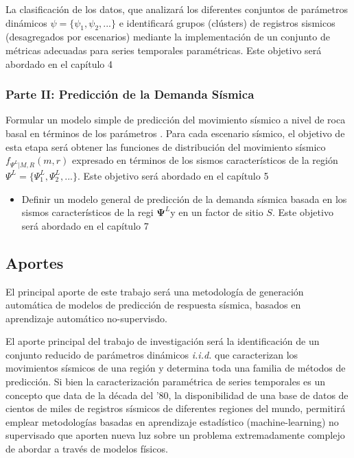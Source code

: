 \documentclass[
]{krantz}
\providecommand{\tightlist}{%
  \setlength{\itemsep}{0pt}\setlength{\parskip}{0pt}}
\begin{document}
La clasificación de los datos, que analizará los diferentes conjuntos de parámetros dinámicos \(\psi = \{ \psi_1,\psi_2,... \}\) e identificará grupos (clústers) de registros sismicos (desagregados por escenarios) mediante la implementación de un conjunto de métricas adecuadas para series temporales paramétricas. Este objetivo será abordado en el capítulo 4

\hypertarget{parte-ii-predicciuxf3n-de-la-demanda-suxedsmica}{%
\subsubsection*{Parte II: Predicción de la Demanda Sísmica}\label{parte-ii-predicciuxf3n-de-la-demanda-suxedsmica}}

Formular un modelo simple de predicción del movimiento sísmico a nivel de roca basal en términos de los parámetros . Para cada escenario sísmico, el objetivo de esta etapa será obtener las funciones de distribución del movimiento sísmico \(f_{\Psi^L|M,R}\left(m,r \right)\) expresado en términos de los sismos característicos de la región \(\Psi^L = \{ \Psi_1^L,\Psi_2^L,... \}\). Este objetivo será abordado en el capítulo 5

\begin{itemize}
\tightlist
\item
  Definir un modelo general de predicción de la demanda sísmica basada en los sismos característicos de la regi \(\pmb\Psi^L\)y en un factor de sitio \(S\). Este objetivo será abordado en el capítulo 7
\end{itemize}

\hypertarget{section}{%
\subsubsection*{}\label{section}}

\hypertarget{aportes}{%
\subsection*{Aportes}\label{aportes}}

El principal aporte de este trabajo será una metodología de generación automática de modelos de predicción de respuesta sísmica, basados en aprendizaje automático no-supervisdo.

El aporte principal del trabajo de investigación será la identificación de un conjunto reducido de parámetros dinámicos \emph{i.i.d.} que caracterizan los movimientos sísmicos de una región y determina toda una familia de métodos de predicción. Si bien la caracterización paramétrica de series temporales es un concepto que data de la década del '80, la disponibilidad de una base de datos de cientos de miles de registros sísmicos de diferentes regiones del mundo, permitirá emplear metodologías basadas en aprendizaje estadístico (machine-learning) no supervisado que aporten nueva luz sobre un problema extremadamente complejo de abordar a través de modelos físicos.
\end{document}
